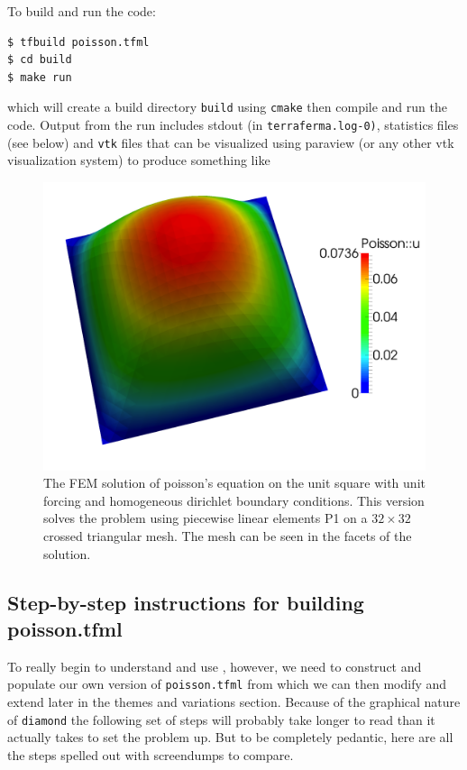 To build and run the code:
\begin{lstlisting}[style=Bash]
$ tfbuild poisson.tfml
$ cd build
$ make run 
\end{lstlisting}
which will create a build directory \texttt{build} using
\texttt{cmake} then compile and run the code. Output from the run
includes stdout (in \texttt{terraferma.log-0)}, statistics files (see
below) and \texttt{vtk} files that can be visualized using paraview
(or any other vtk visualization system) to produce something like
\begin{figure}[h]
  \centering
  \includegraphics[width=.9\textwidth]{figures/poisson_simple.png}
  \caption{\protect\small The FEM solution of poisson's equation on the unit square
    with unit forcing and homogeneous dirichlet boundary conditions.
    This version solves the problem using piecewise linear elements P1
    on a $32\times 32$ crossed triangular mesh. The mesh can be seen
    in the facets of the solution.}
  \label{fig:simple_poisson}
\end{figure}

\subsection{Step-by-step instructions for building poisson.tfml}
\label{sec:step-step-instr}

To really begin to understand and use \TF{}, however, we need to
construct and populate our own version of \texttt{poisson.tfml} from
which we can then modify and extend later in the themes and variations
section.  Because of the graphical nature of \texttt{diamond} the
following set of steps will probably take longer to read than it
actually takes to set the problem up.  But to be completely pedantic,
here are all the steps spelled out with screendumps to compare.

